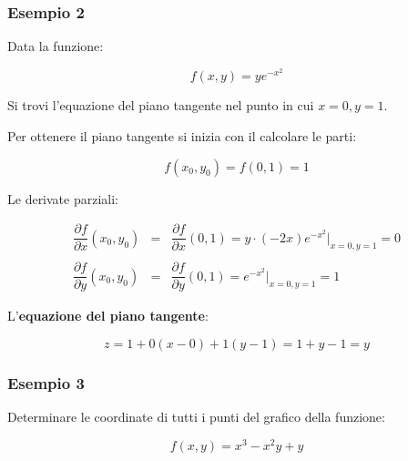 \documentclass[a4paper]{article}
\begin{document}
	\newpage
	
	\subsubsection[Esempio 2]{\textcolor{Green4}{Esempio 2}}
	
	Data la funzione:
	
	\begin{equation*}
		f\left(x,y\right) = ye^{-x^{2}}
	\end{equation*}

	\noindent
	Si trovi l'equazione del piano tangente nel punto in cui $x = 0, y = 1$.\newline
	
	\noindent
	Per ottenere il piano tangente si inizia con il calcolare le parti:
	
	\begin{equation*}
		f\left(x_{0}, y_{0}\right) = f\left(0,1\right) = 1
	\end{equation*}

	\noindent
	Le derivate parziali:
	
	\begin{equation*}
		\begin{array}{lll}
			\dfrac{\partial f}{\partial x}\left(x_{0},y_{0}\right) & = & \dfrac{\partial f}{\partial x}\left(0,1\right) = y \cdot \left(-2x\right)e^{-x^{2}} \Bigg|_{x=0, y=1} = 0 \\
			&& \\
			\dfrac{\partial f}{\partial y}\left(x_{0},y_{0}\right) & = & \dfrac{\partial f}{\partial y}\left(0,1\right) = e^{-x^{2}} \Bigg|_{x=0, y=1} = 1
		\end{array}
	\end{equation*}

	\noindent
	L'\textbf{equazione del piano tangente}:
	
	\begin{equation*}
		z = 1 + 0\left(x-0\right) + 1\left(y-1\right) = 1 + y - 1 = y
	\end{equation*}

	\newpage

	\subsubsection[Esempio 3]{\textcolor{Green4}{Esempio 3}}
	
	Determinare le coordinate di tutti i punti del grafico della funzione:
	
	\begin{equation*}
		f\left(x,y\right) = x^{3} - x^{2}y + y
	\end{equation*}
\end{document}

